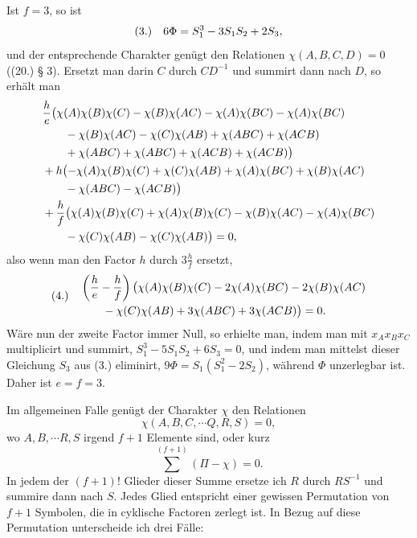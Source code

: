 \documentclass[11pt]{article}
\makeatletter
\newcommand{\frobtag}[2]{\[\begin{array}{@{}r@{\quad}l@{}}\textup{(#1)} & \displaystyle #2\end{array}\]}
\newcommand{\frobtagc}[2]{\[\begin{array}{@{}r@{\quad}c@{}}\textup{(#1)} & \displaystyle #2\end{array}\]}
\makeatother
\begin{document}
Ist $f=3$, so ist
\frobtagc{3.}{6\Phi=S_1^3-3S_1S_2+2S_3,}
und der entsprechende Charakter genügt den Relationen $\chi(A,B,C,D)=0$ ((20.) § 3). Ersetzt man darin $C$ durch $CD^{-1}$ und summirt dann nach $D$, so erhält man
\[
\begin{aligned}
&\frac{h}{e}\bigl(\chi(A)\chi(B)\chi(C)-\chi(B)\chi(AC)-\chi(A)\chi(BC)-\chi(A)\chi(BC)\nobreak\\
&\qquad{}-\chi(B)\chi(AC)-\chi(C)\chi(AB)+\chi(ABC)+\chi(ACB)\nobreak\\
&\qquad{}+\chi(ABC)+\chi(ABC)+\chi(ACB)+\chi(ACB)\bigr)\nobreak\\
&{}+h\bigl(-\chi(A)\chi(B)\chi(C)+\chi(C)\chi(AB)+\chi(A)\chi(BC)+\chi(B)\chi(AC)\nobreak\\
&\qquad{}-\chi(ABC)-\chi(ACB)\bigr)\nobreak\\
&{}+\frac{h}{f}\bigl(\chi(A)\chi(B)\chi(C)+\chi(A)\chi(B)\chi(C)-\chi(B)\chi(AC)-\chi(A)\chi(BC)\nobreak\\
&\qquad{}-\chi(C)\chi(AB)-\chi(C)\chi(AB)\bigr)=0,
\end{aligned}
\]
also wenn man den Factor $h$ durch $3\frac{h}{f}$ ersetzt,
\frobtag{4.}{\begin{aligned}
&\left(\frac{h}{e}-\frac{h}{f}\right)\bigl(\chi(A)\chi(B)\chi(C)-2\chi(A)\chi(BC)-2\chi(B)\chi(AC)\nobreak\\
&\qquad{}-\chi(C)\chi(AB)+3\chi(ABC)+3\chi(ACB)\bigr)=0.
\end{aligned}}
Wäre nun der zweite Factor immer Null, so erhielte man, indem man mit $x_Ax_Bx_C$ multiplicirt und summirt, $S_1^3-5S_1S_2+6S_3=0$, und indem man mittelst dieser Gleichung $S_3$ aus (3.) eliminirt, $9\Phi=S_1(S_1^2-2S_2)$, während $\Phi$ unzerlegbar ist. Daher ist $e=f=3$.

Im allgemeinen Falle genügt der Charakter $\chi$ den Relationen
\[
\chi(A,B,C,\cdots Q,R,S)=0,
\]
wo $A,B,\cdots R,S$ irgend $f+1$ Elemente sind, oder kurz
\[
\sum^{(f+1)}(\Pi-\chi)=0.
\]
In jedem der $(f+1)!$ Glieder dieser Summe ersetze ich $R$ durch $RS^{-1}$ und summire dann nach $S$. Jedes Glied entspricht einer gewissen Permutation von $f+1$ Symbolen, die in cyklische Factoren zerlegt ist. In Bezug auf diese Permutation unterscheide ich drei Fälle:
\end{document}
